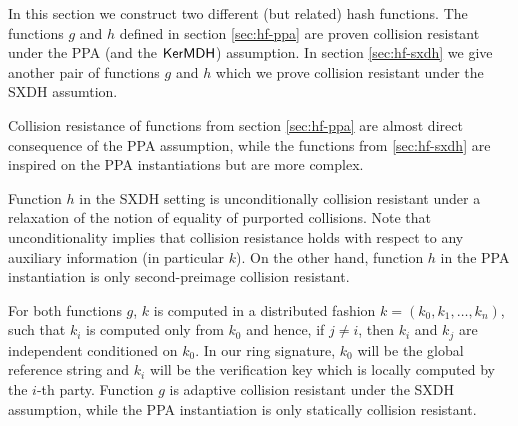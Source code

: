
In this section we construct two different (but related) hash functions. The functions $g$ and $h$ defined in section \ref{sec:hf-ppa}  are proven collision resistant under the PPA (and the $\mathsf{KerMDH}$) assumption. In section \ref{sec:hf-sxdh} we give another pair of functions $g$ and $h$ which we prove collision resistant under the SXDH assumtion.

Collision resistance of functions from section \ref{sec:hf-ppa} are almost direct consequence of the PPA assumption, while the functions from \ref{sec:hf-sxdh} are inspired on the PPA instantiations but are more complex. %

Function $h$ in the SXDH setting is unconditionally collision resistant under a relaxation of the notion of equality of purported collisions. Note that unconditionality implies that collision resistance holds with respect to any auxiliary information (in particular $k$). On the other hand, function $h$ in the PPA instantiation is only second-preimage collision resistant.

For both functions $g$, $k$ is computed in a distributed fashion $k = (k_0,k_1,\ldots,k_n)$, such that $k_i$ is computed only from $k_0$ and hence, if $j\neq i$, then $k_i$ and $k_j$ are independent conditioned on $k_0$. In our ring signature, $k_0$ will be the global reference string and $k_i$ will be the verification key which is locally computed by the $i$-th party. 
Function $g$ is adaptive collision resistant under the SXDH assumption, while the PPA instantiation is only statically collision resistant.

